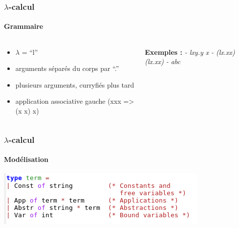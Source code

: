 \documentclass{beamer}
\begin{document}
 


\begin{frame}
\frametitle{$\lambda$-calcul}
\framesubtitle{Grammaire}

\begin{columns}

\begin{column}{5cm}
\begin{itemize}
\item $\lambda$ = ``l''
\item arguments séparés du corps par ``.''
\item plusieurs arguments, curryfiés plus tard
\item application associative gauche (xxx => (x x) x)
\end{itemize}
\end{column}

\begin{column}{5cm}
\textbf{Exemples :}
\linebreak
\linebreak
\textit{- lxy.y x}
\linebreak
\textit{- (lx.xx)(lx.xx)}
\linebreak
\textit{- abc}
\end{column}

\end{columns}

\end{frame}

\begin{frame}
\frametitle{$\lambda$-calcul}
\framesubtitle{Modélisation}

\includegraphics{lambda2.png}

\end{frame}
\end{document}

